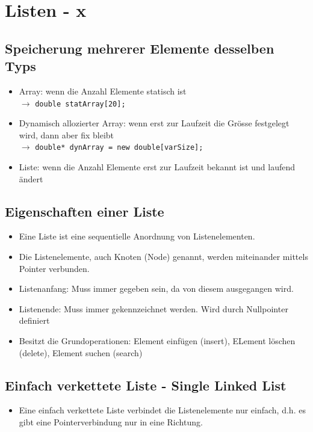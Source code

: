 \section{Listen - x}
\subsection{Speicherung mehrerer Elemente desselben Typs}
\begin{itemize}
  \item Array: wenn die Anzahl Elemente statisch ist \\ $\rightarrow$  \lstinline{double statArray[20];} 
  \item Dynamisch allozierter Array: wenn erst zur Laufzeit die Grösse festgelegt wird, dann aber fix bleibt \\ $\rightarrow$ 
  \lstinline{double* dynArray = new double[varSize];}
  \item Liste: wenn die Anzahl Elemente erst zur Laufzeit bekannt ist und laufend ändert
\end{itemize}

\subsection{Eigenschaften einer Liste}
\begin{itemize}
  \item Eine Liste ist eine sequentielle Anordnung von Listenelementen.
  \item Die Listenelemente, auch Knoten (Node) genannt, werden miteinander mittels Pointer verbunden.
  \item Listenanfang: Muss immer gegeben sein, da von diesem ausgegangen wird. 
  \item Listenende: Muss immer gekennzeichnet werden. Wird durch Nullpointer definiert
  \item Besitzt die Grundoperationen: Element einfügen (insert), ELement löschen (delete), Element suchen (search)
\end{itemize}

\subsection{Einfach verkettete Liste - Single Linked List}
\begin{itemize}
  \item Eine einfach verkettete Liste verbindet die Listenelemente nur einfach, d.h. es gibt eine Pointerverbindung nur in eine Richtung.
\end{itemize}

